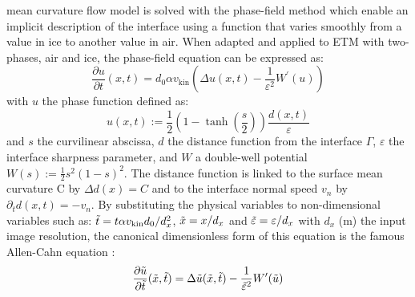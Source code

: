 \documentclass[draft,ms]{agujournal2019}
\begin{document}
 mean curvature flow model is solved with the phase-field method which enable an implicit description of the interface using a function that varies smoothly from a value in ice to another value in air.  When adapted and applied to ETM with two-phases, air and ice, the phase-field equation can be expressed as:\\
\begin{equation}\label{eq:phase-field}\frac{\partial u}{\partial t}(x, t)= d_0 \alpha v_{\mathrm{kin}} \left(\Delta u(x, t)-\frac{1}{\varepsilon^{2}} W^{\prime}(u)\right)\end{equation}
\noindent with $u$ the phase function defined as: \begin{equation}\label{eq:phase-func}
u(x,t) := \frac{1}{2}\left(1-\tanh\left(\frac{s}{2}\right)\right)\frac{d(x,t)}{\varepsilon}
\end{equation}
and $s$ the curvilinear  abscissa, $d$ the distance function from the interface $\Gamma$, $\varepsilon$ the interface sharpness parameter, and $W$ a double-well potential $W(s):=\frac{1}{2} s^{2}(1-s)^{2}$. The distance function  is linked to the surface mean curvature C by $\Delta d(x) = C$ and to the interface normal speed $v_n$ by $\partial_t d (x,t) = - v_n$. By substituting the physical variables to non-dimensional variables such as: $\Tilde{t} = t \alpha v_{\mathrm{kin}} d_0 / d_x^2 $, $\Tilde{x} = x/d_x$ and $\Tilde{\varepsilon} = \varepsilon/d_x$ with $d_x$ (m) the input image resolution, the canonical dimensionless form of this equation is the famous Allen-Cahn equation \cite{bretin_and_denis_discrete-continuous_2015, kaempfer_phase-field_2009}:
\begin{equation}\label{eq:allen-cahn}\frac{\partial \Tilde{u}}{\partial \Tilde{t}}(\Tilde{x}, \Tilde{t})=\Delta \Tilde{u}(\Tilde{x}, \Tilde{t})-\frac{1}{\Tilde{\varepsilon}^{2}} W^{\prime}(\Tilde{u})\end{equation}
\end{document}
